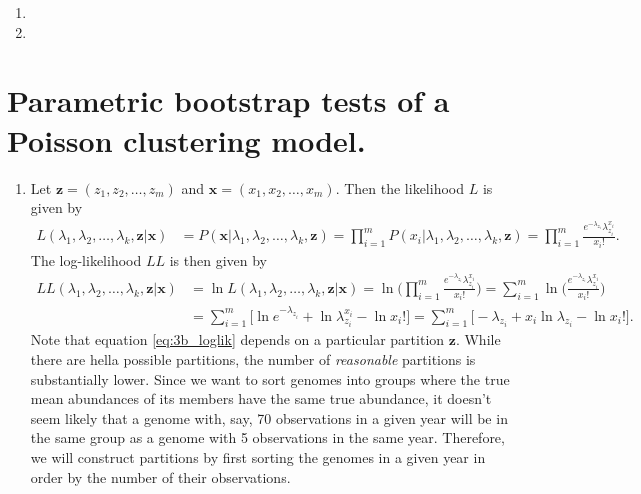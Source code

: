 \documentclass[10pt]{article}
\begin{document}
    \begin{enumerate}[label = \textbf{\alph*.}]
        \item 
        
        \item 

    \end{enumerate}

\section*{Parametric bootstrap tests of a Poisson clustering model.}
    \begin{enumerate}[label = \textbf{\alph*.}]
        \item Let $\bm{z} = (z_1, z_2, \dots, z_m)$ and $\bm{x} = (x_1, x_2, \dots, x_m)$.  Then the likelihood $L$ is given by
            \begin{align}\label{eq:3b_lik}
                L(\lambda_1, \lambda_2, \dots, \lambda_k, \bm{z} | \bm{x}) &= P(\bm{x} | \lambda_1, \lambda_2, \dots, \lambda_k, \bm{z}) = \prod_{i = 1}^m P(x_i | \lambda_1, \lambda_2, \dots, \lambda_k, \bm{z})= \prod_{i = 1}^m \frac{e^{-\lambda_{z_i}}\lambda_{z_i}^{x_i}}{x_i!}.
            \end{align}
        The log-likelihood $LL$ is then given by
            \begin{align}\label{eq:3b_loglik}
                LL(\lambda_1, \lambda_2, \dots, \lambda_k, \bm{z} | \bm{x}) &= \ln{L(\lambda_1, \lambda_2, \dots, \lambda_k, \bm{z} | \bm{x})} = \ln\Bigg(\prod_{i = 1}^m \frac{e^{-\lambda_{z_i}}\lambda_{z_i}^{x_i}}{x_i!}\Bigg) = \sum_{i = 1}^m \ln\Bigg(\frac{e^{-\lambda_{z_i}}\lambda_{z_i}^{x_i}}{x_i!}\Bigg)\nonumber\\
                        &= \sum_{i = 1}^m \Big[ \ln{e^{-\lambda_{z_i}}} + \ln{\lambda_{z_i}^{x_i}} - \ln{x_i!}\Big] = \sum_{i = 1}^m \Big[-\lambda_{z_i} + x_i \ln{\lambda_{z_i}} - \ln{x_i!}\Big].
            \end{align}
        Note that equation \ref{eq:3b_loglik} depends on a particular partition $\bm{z}$.  While there are hella possible partitions, the number of \textit{reasonable} partitions is substantially lower.  Since we want to sort genomes into groups where the true mean abundances of its members have the same true abundance, it doesn't seem likely that a genome with, say, 70 observations in a given year will be in the same group as a genome with 5 observations in the same year.  Therefore, we will construct partitions by first sorting the genomes in a given year in order by the number of their observations.
        

\end{enumerate}
\end{document}
